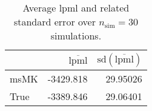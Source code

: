 \begin{table}[H]

\caption{Average lpml and related standard error over $n_{\text{sim}} = 30$ simulations.}
\centering
\begin{tabular}[t]{lrr}
\toprule
  & $\overbar{\text{lpml}}$ & $\text{sd}(\overbar{\text{lpml}})$\\
\midrule
msMK & -3429.818 & 29.95026\\
True & -3389.846 & 29.06401\\
\bottomrule
\end{tabular}
\end{table}